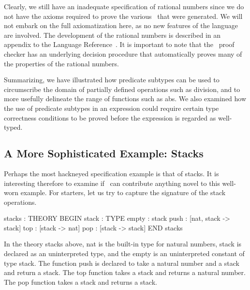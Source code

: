 Clearly, we still have an inadequate specification of rational numbers
since we do not have the axioms required to prove the various \tccs\ that
were generated.  We will not embark on the full axiomatization here, as
no new features of the language are involved.  The development of the
rational numbers is described in an appendix to the Language
Reference~\cite{PVS:language}.  It is important to note that the \pvs\
proof checker has an underlying decision procedure that automatically
proves many of the properties of the rational numbers.

Summarizing, we have illustrated how predicate subtypes can be used
to circumscribe the domain of partially defined operations such as
division, and to more usefully delineate the range of functions such as
{\stt abs}.  We also examined how the use of predicate subtypes in an
expression could require certain type correctness conditions to be
proved before the expression is regarded as well-typed.


\subsection{A More Sophisticated Example: Stacks}

Perhaps the most hackneyed specification example is that of stacks.  It
is interesting therefore to examine if \pvs\ can contribute anything
novel to this well-worn example.  For starters, let us try to capture
the signature of the stack operations.
\begin{pvsexample}
  stacks : THEORY
   BEGIN
    stack : TYPE
    empty : stack
    push : [nat, stack -> stack]
    top : [stack -> nat]
    pop : [stack -> stack]
   END stacks
\end{pvsexample}
%
In the theory {\stt stacks} above, {\stt nat} is the built-in type for
natural numbers, {\stt stack} is declared as an uninterpreted type,
and the {\stt empty} is an uninterpreted constant of type {\stt
stack}.  The function {\stt push} is declared to take a natural number
and a stack and return a stack.  The {\stt top} function takes a stack
and returns a natural number.  The {\stt pop} function takes a stack
and returns a stack.

